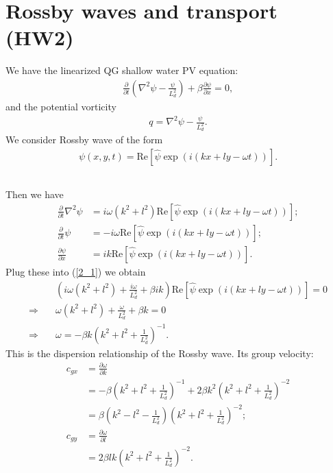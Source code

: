 \documentclass[11pt,letterpaper]{book}
\theoremstyle{definition}
\newcommand{\pe}{\partial}
\newcommand{\thus}{\Rightarrow \quad }
\newcommand{\re}{\text{Re}}
\begin{document}
\newpage
\section{Rossby waves and transport (HW2)}
We have the linearized QG shallow water PV equation:
\begin{align}
\frac{\pe}{\pe t}\left(\nabla^2 \psi-\frac{\psi}{L_d^2}\right)+\beta\frac{\pe\psi}{\pe x} = 0,\label{2_1}
\end{align}
and the potential vorticity
\begin{align*}
q = \nabla^2 \psi-\frac{\psi}{L_d^2}.
\end{align*}
We consider Rossby wave of the form 
\begin{align*}
\psi(x,y,t) = \re\left[ \hat{\psi}\exp(i(kx+ly-\omega t)) \right].
\end{align*}

\subsection{}
Then we have
\begin{align*}
\frac{\pe}{\pe t}\nabla^2\psi &= i\omega(k^2+l^2)\re\left[ \hat{\psi}\exp(i(kx+ly-\omega t)) \right];\\
\frac{\pe}{\pe t}\psi &= -i\omega\re\left[ \hat{\psi}\exp(i(kx+ly-\omega t)) \right];\\
\frac{\pe\psi}{\pe x}&= ik\re\left[ \hat{\psi}\exp(i(kx+ly-\omega t)) \right].
\end{align*}
Plug these into (\ref{2_1}) we obtain
\begin{align*}
&\left(i\omega(k^2+l^2)+\frac{i\omega}{L_d^2}+\beta ik\right)\re\left[ \hat{\psi}\exp(i(kx+ly-\omega t)) \right] = 0\\
\thus& \omega(k^2+l^2)+\frac{\omega}{L_d^2}+\beta k = 0\\
\thus& \omega = -\beta k\left( k^2+l^2+\frac{1}{L_d^2} \right)^{-1}.
\end{align*}
This is the dispersion relationship of the Rossby wave. Its group velocity:
\begin{align*}
c_{gx} &= \frac{\pe\omega}{\pe k}\\
&= -\beta\left( k^2+l^2+\frac{1}{L_d^2} \right)^{-1}+2\beta k^2\left( k^2+l^2+\frac{1}{L_d^2} \right)^{-2} \\
&= \beta\left( k^2-l^2-\frac{1}{L_d^2} \right)\left( k^2+l^2+\frac{1}{L_d^2} \right)^{-2};\\
c_{gy} &= \frac{\pe\omega}{\pe l}\\
&= 2\beta l k\left( k^2+l^2+\frac{1}{L_d^2} \right)^{-2}.
\end{align*}
\end{document}
